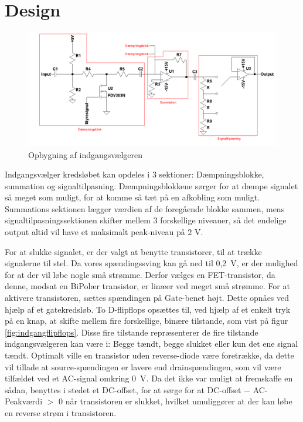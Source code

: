 \section{Design}

\begin{figure}[h]
\centering
\includegraphics[width=\textwidth]{teknisk/indgangsvaelger/signal-taend-sluk.png}
\caption{Opbygning af indgangsvælgeren}
\label{indgangsvaelger-overordnet}
\end{figure}
Indgangsvælger kredsløbet kan opdeles i 3 sektioner: Dæmpningsblokke, summation og	 signaltilpasning. Dæmpningsblokkene sørger for at dæmpe signalet så meget som muligt, for at komme så tæt på en afkobling som muligt. Summations sektionen lægger værdien af de foregående blokke sammen, mens signaltilpasningssektionen skifter mellem 3 forskellige niveauer, så det endelige output altid vil have et maksimalt peak-niveau på 2 V.  

For at slukke signalet, er der valgt at benytte transistorer, til at trække signalerne til stel. Da vores spændingssving kan gå ned til 0,2~V, er der mulighed for at der vil løbe nogle små strømme. Derfor vælges en FET-transistor, da denne, modsat en BiPolær transistor, er linæer ved meget små strømme. For at aktivere transistoren, sættes spændingen på Gate-benet højt. Dette opnåes ved hjælp af et gatekredsløb. To D-flipflops opsættes til, ved hjælp af et enkelt tryk på en knap, at skifte mellem fire forskellige, binære tilstande, som vist på figur \ref{fig:indgangflipflops}. Disse fire tilstande repræsenterer de fire tilstande indgangsvælgeren kan være i: Begge tændt, begge slukket eller kun det ene signal tændt.
Optimalt ville en transistor uden reverse-diode være foretrække, da dette vil tillade at source-spændingen er lavere end drainspændingen, som vil være tilfældet ved et AC-signal omkring 0~V. Da det ikke var muligt at fremskaffe en sådan, benyttes i stedet et DC-offset, for at sørge for at DC-offset $-$ AC-Peakværdi $>$ 0 når transistoren er slukket, hvilket umuliggører at der kan løbe en reverse strøm i transistoren.

